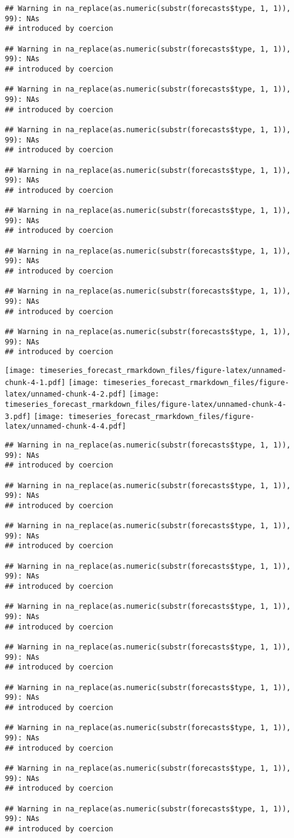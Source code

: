 \documentclass[
]{article}
\begin{document}
\begin{verbatim}
## Warning in na_replace(as.numeric(substr(forecasts$type, 1, 1)), 99): NAs
## introduced by coercion

## Warning in na_replace(as.numeric(substr(forecasts$type, 1, 1)), 99): NAs
## introduced by coercion

## Warning in na_replace(as.numeric(substr(forecasts$type, 1, 1)), 99): NAs
## introduced by coercion

## Warning in na_replace(as.numeric(substr(forecasts$type, 1, 1)), 99): NAs
## introduced by coercion

## Warning in na_replace(as.numeric(substr(forecasts$type, 1, 1)), 99): NAs
## introduced by coercion

## Warning in na_replace(as.numeric(substr(forecasts$type, 1, 1)), 99): NAs
## introduced by coercion

## Warning in na_replace(as.numeric(substr(forecasts$type, 1, 1)), 99): NAs
## introduced by coercion

## Warning in na_replace(as.numeric(substr(forecasts$type, 1, 1)), 99): NAs
## introduced by coercion

## Warning in na_replace(as.numeric(substr(forecasts$type, 1, 1)), 99): NAs
## introduced by coercion
\end{verbatim}

\texttt{[image: timeseries\_forecast\_rmarkdown\_files/figure-latex/unnamed-chunk-4-1.pdf]}
\texttt{[image: timeseries\_forecast\_rmarkdown\_files/figure-latex/unnamed-chunk-4-2.pdf]}
\texttt{[image: timeseries\_forecast\_rmarkdown\_files/figure-latex/unnamed-chunk-4-3.pdf]}
\texttt{[image: timeseries\_forecast\_rmarkdown\_files/figure-latex/unnamed-chunk-4-4.pdf]}

\begin{verbatim}
## Warning in na_replace(as.numeric(substr(forecasts$type, 1, 1)), 99): NAs
## introduced by coercion

## Warning in na_replace(as.numeric(substr(forecasts$type, 1, 1)), 99): NAs
## introduced by coercion

## Warning in na_replace(as.numeric(substr(forecasts$type, 1, 1)), 99): NAs
## introduced by coercion

## Warning in na_replace(as.numeric(substr(forecasts$type, 1, 1)), 99): NAs
## introduced by coercion

## Warning in na_replace(as.numeric(substr(forecasts$type, 1, 1)), 99): NAs
## introduced by coercion

## Warning in na_replace(as.numeric(substr(forecasts$type, 1, 1)), 99): NAs
## introduced by coercion

## Warning in na_replace(as.numeric(substr(forecasts$type, 1, 1)), 99): NAs
## introduced by coercion

## Warning in na_replace(as.numeric(substr(forecasts$type, 1, 1)), 99): NAs
## introduced by coercion

## Warning in na_replace(as.numeric(substr(forecasts$type, 1, 1)), 99): NAs
## introduced by coercion

## Warning in na_replace(as.numeric(substr(forecasts$type, 1, 1)), 99): NAs
## introduced by coercion
\end{verbatim}
\end{document}
